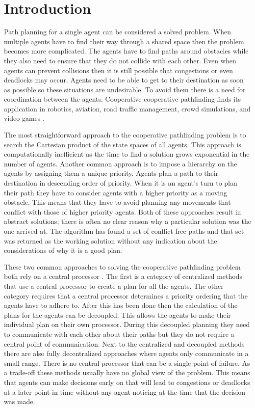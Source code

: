 \section{Introduction}\label{sec:intro}
Path planning for a single agent can be considered a solved problem.
When multiple agents have to find their way through a shared space then the
problem becomes more complicated. The agents have to find paths around
obstacles while they also need to ensure that they do not collide with each
other. Even when agents can prevent collisions then it is still possible that
congestions or even deadlocks may occur. Agents need to be able to get to their
destination as soon as possible so these situations are undesirable. To avoid
them there is a need for coordination between the agents. Cooperative
cooperative pathfinding finds its application in robotics, aviation, road
traffic management, crowd simulations, and video games \cite{standley2011}.

The most straightforward approach to the cooperative pathfinding problem
is to search the Cartesian product of the state spaces of all agents. This
approach is computationally inefficient \cite{hopcroft1984,sharon2013} as the 
time to find a
solution grows exponential in the number of agents. Another common approach is 
to
impose a hierarchy on the agents by assigning them a unique priority. Agents
plan a path to their destination in descending order of priority. When it is an
agent's turn to plan their path they have to consider agents with a higher
priority as a moving obstacle. This means that they have to avoid planning any
movements that conflict with those of higher priority agents. Both of these
approaches result in abstract solutions; there is often no clear reason why a
particular solution was the one arrived at. The algorithm has found a set of
conflict free paths and that set was returned as the working solution without
any indication about the considerations of why it is a good plan.

These two common approaches to solving the cooperative pathfinding problem both
rely on a central processor \cite{chouhan2017}. The first is a category of
centralized methods that use a central processor to create a plan for all the
agents. The other category requires that a central processor determines a
priority ordering that the agents have to adhere to. After this has been done
then the calculation of the plans for the agents can be decoupled. This allows
the agents to make their individual plan on their own processor. During this
decoupled planning they need to communicate with each other about their paths
but they do not require a central point of communication. Next to the
centralized and decoupled methods there are also fully decentralized approaches
where agents only communicate in a small range. There is no central processor
that can be a single point of failure. As a trade-off these methods usually
have no global view of the problem. This means that agents can make decisions
early on that will lead to congestions or deadlocks at a later point in time 
without any agent
noticing at the time that the decision was made.

